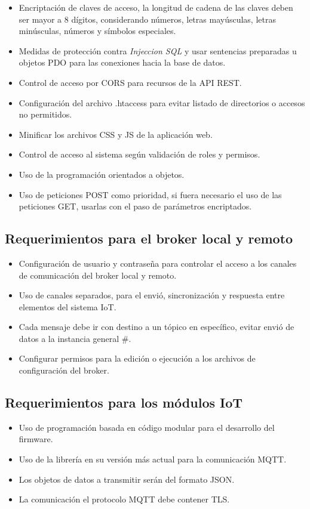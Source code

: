 \begin{itemize}
\item Encriptación de claves de acceso, la longitud de cadena de las claves  deben ser mayor a 8 dígitos, considerando números, letras mayúsculas, letras minúsculas, números y símbolos especiales.
\item Medidas de protección contra \emph{Injeccion SQL} y usar sentencias preparadas u objetos PDO para las conexiones hacia la base de datos.
\item Control de acceso por CORS para recursos de la API REST.
\item Configuración del archivo .htaccess para evitar listado de directorios o accesos no permitidos.
\item Minificar los archivos CSS y JS de la aplicación web.
\item Control de acceso al sistema según validación de roles y permisos.
\item Uso de la programación orientados a objetos.
\item Uso de peticiones POST como prioridad, si fuera necesario el uso de las peticiones GET, usarlas con el paso de parámetros encriptados.
\end{itemize}

\subsection{Requerimientos para el broker local y remoto}

\begin{itemize}
\item Configuración de usuario y contraseña para controlar el acceso a los canales de comunicación del broker local y remoto.
\item Uso de canales separados, para el envió, sincronización y respuesta entre elementos del sistema IoT.
\item Cada mensaje debe ir con destino a un tópico en específico, evitar envió de datos a la instancia general \#.
\item Configurar permisos para la edición o ejecución a los archivos de configuración del broker.
\end{itemize}

\subsection{Requerimientos para los módulos IoT}

\begin{itemize}
\item Uso de programación basada en código modular para el desarrollo del firmware.
\item Uso de la librería en su versión más actual para la comunicación MQTT.
\item Los objetos de datos a transmitir serán del formato JSON.
\item La comunicación el protocolo MQTT debe contener TLS.
\end{itemize}

